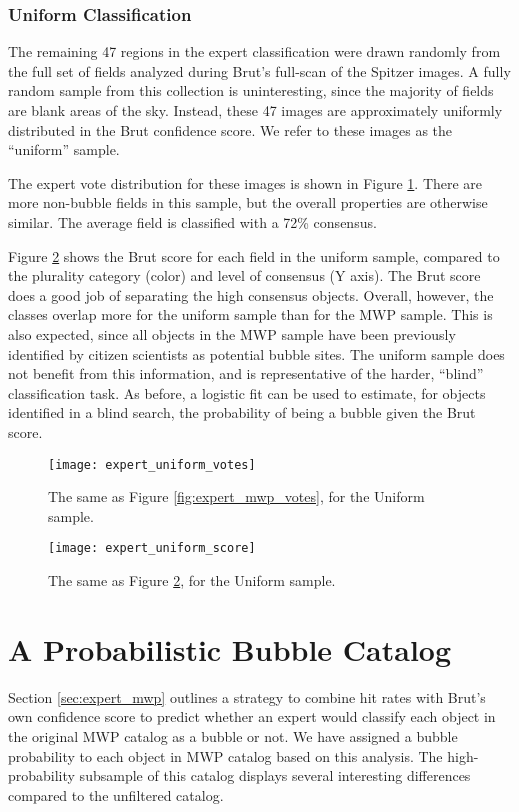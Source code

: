 \documentclass[preprint]{aastex}
\begin{document}
\subsubsection{Uniform Classification}
The remaining 47 regions in the expert classification were drawn randomly from the full set of fields analyzed during Brut's full-scan of the Spitzer images. A fully random sample from this collection is uninteresting, since the majority of fields are blank areas of the sky. Instead, these 47 images are approximately uniformly distributed in the Brut confidence score. We refer to these images as the ``uniform'' sample. 

The expert vote distribution for these images is shown in Figure \ref{fig:expert_uniform_votes}. There are more non-bubble fields in this sample, but the overall properties are otherwise similar. The average field is classified with a 72\% consensus.

Figure \ref{fig:expert_uniform_score} shows the Brut score for each field in the uniform sample, compared to the plurality category (color) and level of consensus (Y axis). The Brut score does a good job of separating the high consensus objects. Overall, however, the classes overlap more for the uniform sample than for the MWP sample. This is also expected, since all objects in the MWP sample have been previously identified by citizen scientists as potential bubble sites. The uniform sample does not benefit from this information, and is representative of the harder, ``blind'' classification task. As before, a logistic fit can be used to estimate, for objects identified in a blind search, the probability of being a bubble given the Brut score.

\begin{figure}
\texttt{[image: expert\_uniform\_votes]}
\caption{The same as Figure \ref{fig:expert_mwp_votes}, for the Uniform sample.}
\label{fig:expert_uniform_votes}
\end{figure}

\begin{figure}
\texttt{[image: expert\_uniform\_score]}
\caption{The same as Figure \ref{fig:expert_uniform_score}, for the Uniform sample.}
\label{fig:expert_uniform_score}
\end{figure}

\section{A Probabilistic Bubble Catalog}
Section \ref{sec:expert_mwp} outlines a strategy to combine hit rates with Brut's own confidence score to predict whether
an expert would classify each object in the original MWP catalog as a bubble or not. We have assigned a bubble probability to each
object in MWP catalog based on this analysis. The high-probability subsample of this catalog displays several interesting differences compared to the unfiltered catalog. 
\end{document}
